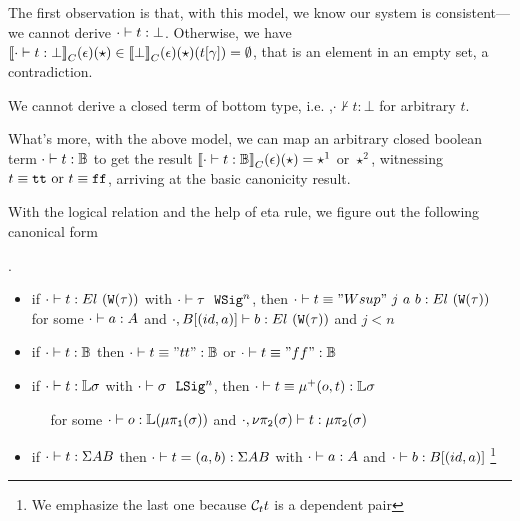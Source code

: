 The first observation is that, with this model, we know our system is consistent---we cannot derive $ {\cdot} \vdash {t} : {\bot} $. Otherwise, we have ${{\llbracket {\ensuremath{ {\cdot} \vdash {t} : {\bot} }} \rrbracket}_C}(\epsilon)(\star) \in {{\llbracket {\bot} \rrbracket}_C}(\epsilon)(\star)({t}\!\left[{\gamma}\right]) = \emptyset$, that is an element in an empty set, a contradiction.

\begin{theorem}[Consistency]
  We cannot derive a closed term of bottom type, i.e. ,$\cdot \not \vdash t : \bot$ for arbitrary $t$.
\end{theorem}

What's more, with the above model, we can map an arbitrary closed boolean term $ {\cdot} \vdash {t} : {\mathbb{B}} $ to get the result ${{\llbracket {\ensuremath{ {\cdot} \vdash {t} : {\mathbb{B}} }} \rrbracket}_C}(\epsilon)(\star) = \star^1$ or $\star^2$, witnessing $t \equiv \texttt{tt} \text{ or } t \equiv\texttt{ff}$, arriving at the basic canonicity result.


With the logical relation and the help of eta rule, we figure out the following canonical form
\begin{theorem}.
  \begin{itemize}
    \item if $ {\cdot} \vdash {t} : {El~(\texttt{W}({\tau}))} $ with $ {\cdot} \vdash {\tau} \ \ \texttt{WSig}^{n} $, then $ {\cdot} \vdash {t \equiv "Wsup"~j~a~b} : {El~(\texttt{W}({\tau}))} $ for some $ {\cdot} \vdash {a} : {A} $ and $ {\cdot, B[(id, a)]} \vdash {b} : {El~(\texttt{W}({\tau}))} $ and $j < n$
    \item if $ {\cdot} \vdash {t} : {\mathbb{B}} $ then $ {\cdot} \vdash {t \equiv "tt"} : {\mathbb{B}} $ or $ {\cdot} \vdash {t \equiv "ff"} : {\mathbb{B}} $ 
    \item if $ {\cdot} \vdash {t} : {\mathbb{L}\sigma} $ with $ {\cdot} \vdash {\sigma} \ \ \texttt{LSig}^{n} $, then $ {\cdot} \vdash {t \equiv \ensuremath{\mu^+({o},{t})}} : {\mathbb{L}\sigma} $ 
    
      $\quad$ for some $ {\cdot} \vdash {o} : {\mathbb{L}(\mu\pi_{\texttt{1}}({\sigma}))} $ and $ {\cdot, \nu\pi_{\texttt{2}}({\sigma})} \vdash {t} : {\mu\pi_{\texttt{2}}({\sigma})} $
    \item if $ {\cdot} \vdash {t} : {\Sigma A B} $ then $ {\cdot} \vdash {t = (a, b)} : {\Sigma A B} $ with $ {\cdot} \vdash {a} : {A} $ and $ {\cdot} \vdash {b} : {B[(id, a)]} $
    \footnote{We emphasize the last one because $\mathcal{C}_t t$ is a dependent pair}
  \end{itemize}
\end{theorem}


